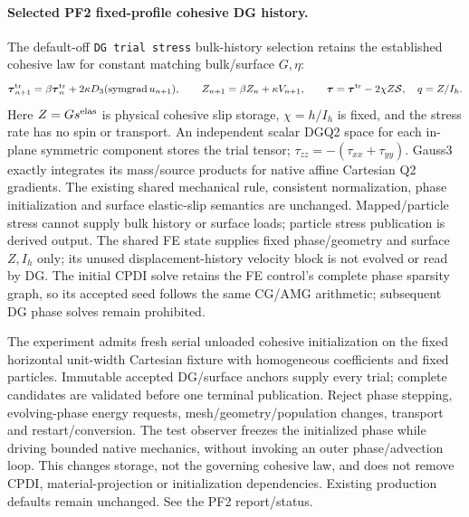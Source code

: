 \documentclass[11pt]{article}
\begin{document}
\paragraph{Selected PF2 fixed-profile cohesive DG history.}
The default-off \texttt{DG trial stress} bulk-history selection retains the
established cohesive law for constant matching bulk/surface $G,\eta$:
\[
 \boldsymbol\tau^{\rm tr}_{n+1}=\beta\boldsymbol\tau^{\rm tr}_n
       +2\kappa D_3(\operatorname{symgrad}u_{n+1}),\qquad
 Z_{n+1}=\beta Z_n+\kappa V_{n+1},\qquad
 \boldsymbol\tau=\boldsymbol\tau^{\rm tr}-2\chi Z\mathcal S,\quad q=Z/I_h.
\]
Here $Z=G s^{\rm elas}$ is physical cohesive slip storage, $\chi=h/I_h$ is
fixed, and the stress rate has no spin or transport. An independent scalar
DGQ2 space for each in-plane symmetric component stores the trial tensor;
$\tau_{zz}=-(\tau_{xx}+\tau_{yy})$. Gauss3 exactly integrates its mass/source
products for native affine Cartesian Q2 gradients. The existing shared
mechanical rule, consistent normalization, phase initialization and surface
elastic-slip semantics are unchanged. Mapped/particle stress cannot supply
bulk history or surface loads; particle stress publication is derived output.
The shared FE state supplies fixed phase/geometry and surface $Z,I_h$ only;
its unused displacement-history velocity block is not evolved or read by DG.
The initial CPDI solve retains the FE control's complete phase sparsity graph,
so its accepted seed follows the same CG/AMG arithmetic; subsequent DG phase
solves remain prohibited.

The experiment admits fresh serial unloaded cohesive initialization on the
fixed horizontal unit-width Cartesian fixture with homogeneous coefficients
and fixed particles. Immutable accepted DG/surface anchors supply every trial;
complete candidates are validated before one terminal publication. Reject
phase stepping, evolving-phase energy requests, mesh/geometry/population
changes, transport and restart/conversion. The test observer freezes the
initialized phase while driving bounded native mechanics, without invoking an
outer phase/advection loop. This changes storage, not the governing cohesive
law, and does not remove CPDI, material-projection or initialization dependencies.
Existing production defaults remain unchanged. See the PF2 report/status.
\end{document}
